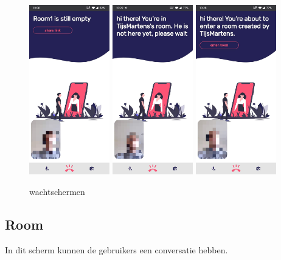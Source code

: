 		\begin{figure}[H]
			\centering
			\includegraphics[width=35mm]{./img/POC/waitAsOwner.jpg}{}		\includegraphics[width=35mm]{./img/POC/waitAsVisitor1.jpg}{}
			\includegraphics[width=35mm]{./img/POC/waitAsVisitor2.jpg}{}
			\caption{wachtschermen}
		\end{figure}
		
		
		
	\subsection{Room}
		In dit scherm kunnen de gebruikers een conversatie hebben. 
		
